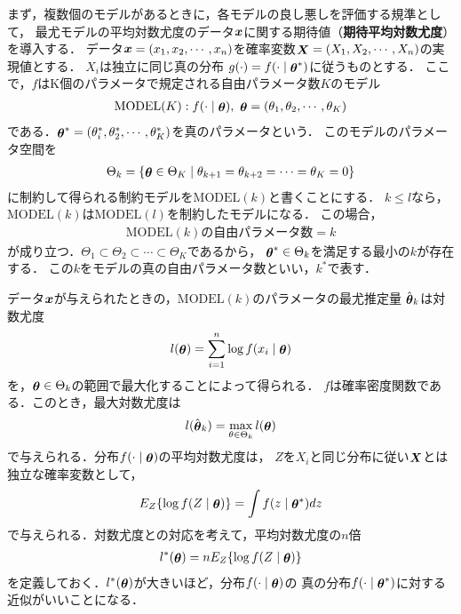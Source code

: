 まず，複数個のモデルがあるときに，各モデルの良し悪しを評価する規準として，
最尤モデルの平均対数尤度のデータ$\mathop{\bm{x}}$に関する期待値（\textbf{期待平均対数尤度}）を導入する．
データ$\mathop{\bm{x}} = (x_1, x_2, \cdots, x_n)$を確率変数$\mathop{\bm{X}}=(X_1, X_2, \cdots, X_n)$の実現値とする．
$X_i$は独立に同じ真の分布 $g(\cdot) = f(\cdot \mid \mathop{\bm{\theta}}^*)$に従うものとする．
ここで，$f$はK個のパラメータで規定される自由パラメータ数$K$のモデル
\begin{align*}
  \mathrm{MODEL}(K) : f(\cdot \mid \vector{\theta}),\ \vector{\theta}=(\theta_1, \theta_2, \cdots, \theta_K)
\end{align*}
である．$\mathop{\bm{\theta}}^* = (\theta_i^*, \theta_2^*, \cdots, \theta_K^*)$を真のパラメータという．
このモデルのパラメータ空間を
\begin{align*}
  \Theta_k = \{ \mathop{\bm{\theta}} \in \Theta_K \mid \theta_{k+1} = \theta_{k+2} = \cdots = \theta_{K} = 0\}
\end{align*}
に制約して得られる制約モデルを$\mathrm{MODEL}(k)$と書くことにする．
$k \leq l$なら，$\mathrm{MODEL}(k)$は$\mathrm{MODEL}(l)$を制約したモデルになる．
この場合，
\begin{align*}
  \mathrm{MODEL}(k)の自由パラメータ数 = k
\end{align*}
が成り立つ．$\Theta_1 \subset \Theta_2 \subset \cdots \subset \Theta_K$であるから，
$\mathop{\bm{\theta}}^* \in \Theta_k$を満足する最小の$k$が存在する．
この$k$をモデルの真の自由パラメータ数といい，$k^*$で表す．

データ$\mathop{\bm{x}}$が与えられたときの，$\mathrm{MODEL}(k)$のパラメータの最尤推定量
$\hat{\mathop{\bm{\theta}}}_k$は対数尤度
\begin{align*}
  l(\mathop{\bm{\theta}}) = \sum_{i=1}^n \log f(x_i \mid \mathop{\bm{\theta}})
\end{align*}
を，$\mathop{\bm{\theta}} \in \Theta_k$の範囲で最大化することによって得られる．
$f$は確率密度関数である．このとき，最大対数尤度は
\begin{align*}
  l(\hat{\mathop{\bm{\theta}}}_k) = \max_{\theta \in \Theta_k} l(\mathop{\bm{\theta}})
\end{align*}
で与えられる．分布$f(\cdot \mid \mathop{\bm{\theta}})$の平均対数尤度は，
$Z$を$X_i$と同じ分布に従い$\mathop{\bm{X}}$とは独立な確率変数として，
\begin{align*}
  E_Z\{\log f(Z \mid \mathop{\bm{\theta}})\} = \int f(z \mid {\textstyle\mathop{\bm{\theta}}^*}) dz
\end{align*}
で与えられる．対数尤度との対応を考えて，平均対数尤度の$n$倍
\begin{align*}
  l^*(\mathop{\bm{\theta}}) = n E_Z \{ \log f(Z \mid \mathop{\bm{\theta}}) \}
\end{align*}
を定義しておく．$l^*(\mathop{\bm{\theta}})$が大きいほど，分布$f(\cdot \mid \mathop{\bm{\theta}})$の
真の分布$f(\cdot \mid \mathop{\bm{\theta}}^*)$に対する近似がいいことになる．

